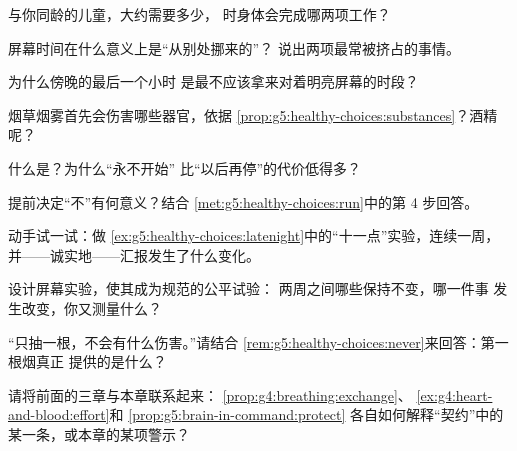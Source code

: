 \begin{exercise}[$\star$]\label{exo:g5:healthy-choices:2}
与你同龄的儿童，大约需要多少，
时身体会完成哪两项工作？
\end{exercise}

\begin{exercise}[$\star$]\label{exo:g5:healthy-choices:3}
屏幕时间在什么意义上是“从别处挪来的”？
说出两项最常被挤占的事情。
\end{exercise}

\begin{exercise}[$\star$]\label{exo:g5:healthy-choices:4}
为什么傍晚的最后一个小时
是最不应该拿来对着明亮屏幕的时段？
\end{exercise}

\begin{exercise}[$\star$]\label{exo:g5:healthy-choices:5}
烟草烟雾首先会伤害哪些器官，依据
\cref{prop:g5:healthy-choices:substances}？酒精呢？
\end{exercise}

\begin{exercise}[$\star$]\label{exo:g5:healthy-choices:6}
什么是？为什么“永不开始”
比“以后再停”的代价低得多？
\end{exercise}

\begin{exercise}[$\star$]\label{exo:g5:healthy-choices:7}
提前决定“不”有何意义？结合
\cref{met:g5:healthy-choices:run}中的第 4 步回答。
\end{exercise}

\begin{exercise}[$\star$]\label{exo:g5:healthy-choices:8}
动手试一试：做
\cref{ex:g5:healthy-choices:latenight}中的“十一点”实验，连续一周，
并——诚实地——汇报发生了什么变化。
\end{exercise}

\begin{exercise}[$\star\star$]\label{exo:g5:healthy-choices:9}
设计屏幕实验，使其成为规范的公平试验：
两周之间哪些保持不变，哪一件事
发生改变，你又测量什么？
\end{exercise}

\begin{exercise}[$\star\star$]\label{exo:g5:healthy-choices:10}
“只抽一根，不会有什么伤害。”请结合
\cref{rem:g5:healthy-choices:never}来回答：第一根烟真正
提供的是什么？
\end{exercise}

\begin{exercise}[$\star\star\star$]\label{exo:g5:healthy-choices:11}
请将前面的三章与本章联系起来：
\cref{prop:g4:breathing:exchange}、
\cref{ex:g4:heart-and-blood:effort}和
\cref{prop:g5:brain-in-command:protect}
各自如何解释“契约”中的某一条，或本章的某项警示？
\end{exercise}
